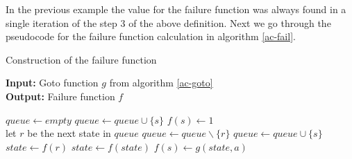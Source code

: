 \documentclass[english,twoside,censored,csm,algorithms-track-2020]{HYthesisML}
\theoremstyle{plain}
\theoremstyle{definition}
\begin{document}
    In the previous example the value for the failure function was always found in a single iteration
    of the step 3 of the above definition. Next we go through the pseudocode for the failure function
    calculation in algorithm \ref{ac-fail}.


  \begin{algorithm}[h!]

    \caption{Construction of the failure function} \label{ac-fail}
    \hspace*{\algorithmicindent} \textbf{Input:} Goto function $g$ from algorithm \ref{ac-goto}\\
    \hspace*{\algorithmicindent} \textbf{Output:} Failure function $f$

    \begin{algorithmic}[1]
        \State $queue\gets \textit{empty}$
          \State $queue\gets queue \cup \{s\}$
          \State $f(s)\gets 1$
        \EndFor
        \\
          \hspace*{\algorithmicindent}let $r$ be the next state in $queue$
          \State $queue\gets queue \backslash \{r\}$
            \State $queue\gets queue \cup \{s\}$
            \State $state\gets f(r)$
              \State $state\gets f(state)$
            \EndWhile
            \State $f(s)\gets g(state,a)$              
          \EndFor
        \EndWhile
          
      \EndFunction

    \end{algorithmic}
  \end{algorithm}
\end{document}
